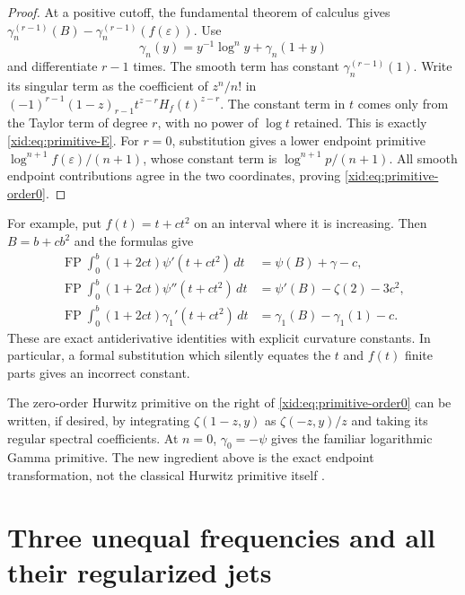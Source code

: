 \documentclass[11pt,a4paper]{article}
\numberwithin{equation}{section}
\theoremstyle{definition}
\theoremstyle{remark}
\DeclareMathOperator{\FP}{FP}
\begin{document}
\begin{proof}
At a positive cutoff, the fundamental theorem of calculus gives
$\gamma_n^{(r-1)}(B)-\gamma_n^{(r-1)}(f(\varepsilon))$.
Use
\[
 \gamma_n(y)=y^{-1}\log^n y+\gamma_n(1+y)
\]
and differentiate $r-1$ times.  The smooth term has constant
$\gamma_n^{(r-1)}(1)$.  Write its singular term as the coefficient
of $z^n/n!$ in
$(-1)^{r-1}(1-z)_{r-1}t^{z-r}H_f(t)^{z-r}$.
The constant term in $t$ comes only from the Taylor term of degree
$r$, with no power of $\log t$ retained.  This is exactly
\eqref{xid:eq:primitive-E}.  For $r=0$, substitution gives a lower
endpoint primitive $\log^{n+1}f(\varepsilon)/(n+1)$, whose constant
term is $\log^{n+1}p/(n+1)$.  All smooth endpoint contributions agree
in the two coordinates, proving \eqref{xid:eq:primitive-order0}.
\end{proof}

For example, put $f(t)=t+c t^2$ on an interval where it is increasing.
Then $B=b+cb^2$ and the formulas give
\begin{align}
 \FP\int_0^b(1+2ct)\psi'(t+ct^2)\,dt
    &=\psi(B)+\gamma-c,\label{xid:eq:psi-prime-curvature}\\
 \FP\int_0^b(1+2ct)\psi''(t+ct^2)\,dt
    &=\psi'(B)-\zeta(2)-3c^2,\label{xid:eq:psi-double-curvature}\\
 \FP\int_0^b(1+2ct)\gamma_1'(t+ct^2)\,dt
    &=\gamma_1(B)-\gamma_1(1)-c.\label{xid:eq:gamma1-curvature}
\end{align}
These are exact antiderivative identities with explicit curvature
constants.  In particular, a formal substitution which silently
equates the $t$ and $f(t)$ finite parts gives an incorrect constant.

The zero-order Hurwitz primitive on the right of
\eqref{xid:eq:primitive-order0} can be written, if desired, by integrating
$\zeta(1-z,y)$ as $\zeta(-z,y)/z$ and taking its regular spectral
coefficients.  At $n=0$, $\gamma_0=-\psi$ gives the familiar
logarithmic Gamma primitive.  The new ingredient above is the exact
endpoint transformation, not the classical Hurwitz primitive itself
\cite{EspinosaMoll2}.



\section{Three unequal frequencies and all their regularized jets}
\label{xid:sec:triple-dilation}
\end{document}
